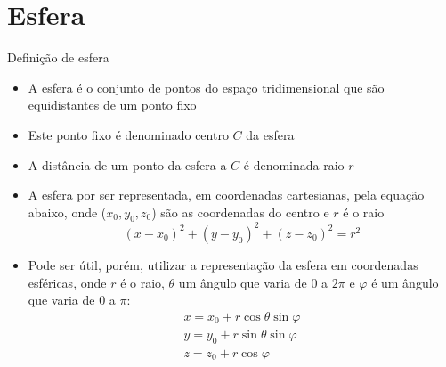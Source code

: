 \section{Esfera}

\begin{frame}[fragile]{Definição de esfera}

    \begin{itemize}
        \item A esfera é o conjunto de pontos do espaço tridimensional que são equidistantes
            de um ponto fixo
        \pause

        \item Este ponto fixo é denominado centro $C$ da esfera
        \pause

        \item A distância de um ponto da esfera a $C$ é denominada raio $r$
        \pause

        \item A esfera por ser representada, em coordenadas cartesianas, pela equação abaixo,
        onde ($x_0, y_0, z_0$) são as coordenadas do centro e $r$ é o raio
        \[
            (x - x_0)^2 + (y - y_0)^2 + (z - z_0)^2 = r^2
        \]
        \pause

        \item Pode ser útil, porém, utilizar a representação da esfera em coordenadas esféricas, 
            onde $r$ é o raio, $\theta$ um ângulo que varia de 0 a $2\pi$ e $\varphi$ é um ângulo 
            que varia de 0 a $\pi$:
        \[
            \begin{array}{l}
                x = x_0 + r\cos \theta\sin \varphi \\
                y = y_0 + r\sin \theta\sin \varphi \\
                z = z_0 + r\cos \varphi \\
            \end{array}
        \]

    \end{itemize}

\end{frame}

